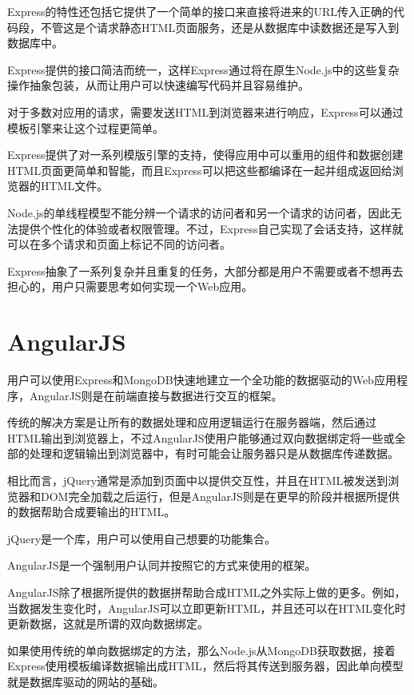 Express的特性还包括它提供了一个简单的接口来直接将进来的URL传入正确的代码段，不管这是个请求静态HTML页面服务，还是从数据库中读数据还是写入到数据库中。

Express提供的接口简洁而统一，这样Express通过将在原生Node.js中的这些复杂操作抽象包装，从而让用户可以快速编写代码并且容易维护。

对于多数对应用的请求，需要发送HTML到浏览器来进行响应，Express可以通过模板引擎来让这个过程更简单。

Express提供了对一系列模版引擎的支持，使得应用中可以重用的组件和数据创建HTML页面更简单和智能，而且Express可以把这些都编译在一起并组成返回给浏览器的HTML文件。

Node.js的单线程模型不能分辨一个请求的访问者和另一个请求的访问者，因此无法提供个性化的体验或者权限管理。不过，Express自己实现了会话支持，这样就可以在多个请求和页面上标记不同的访问者。

Express抽象了一系列复杂并且重复的任务，大部分都是用户不需要或者不想再去担心的，用户只需要思考如何实现一个Web应用。


\section{AngularJS}

用户可以使用Express和MongoDB快速地建立一个全功能的数据驱动的Web应用程序，AngularJS则是在前端直接与数据进行交互的框架。

传统的解决方案是让所有的数据处理和应用逻辑运行在服务器端，然后通过HTML输出到浏览器上，不过AngularJS使用户能够通过双向数据绑定将一些或全部的处理和逻辑输出到浏览器中，有时可能会让服务器只是从数据库传递数据。

相比而言，jQuery通常是添加到页面中以提供交互性，并且在HTML被发送到浏览器和DOM完全加载之后运行，但是AngularJS则是在更早的阶段并根据所提供的数据帮助合成要输出的HTML。

\begin{compactitem}
\item jQuery是一个库，用户可以使用自己想要的功能集合。
\item AngularJS是一个强制用户认同并按照它的方式来使用的框架。
\end{compactitem}

AngularJS除了根据所提供的数据拼帮助合成HTML之外实际上做的更多。例如，当数据发生变化时，AngularJS可以立即更新HTML，并且还可以在HTML变化时更新数据，这就是所谓的双向数据绑定。


如果使用传统的单向数据绑定的方法，那么Node.js从MongoDB获取数据，接着Express使用模板编译数据输出成HTML，然后将其传送到服务器，因此单向模型就是数据库驱动的网站的基础。

